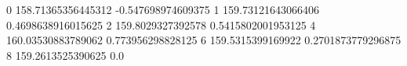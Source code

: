 0 158.71365356445312 -0.547698974609375
1 159.73121643066406 0.4698638916015625
2 159.8029327392578 0.5415802001953125
4 160.03530883789062 0.773956298828125
6 159.5315399169922 0.2701873779296875
8 159.2613525390625 0.0
